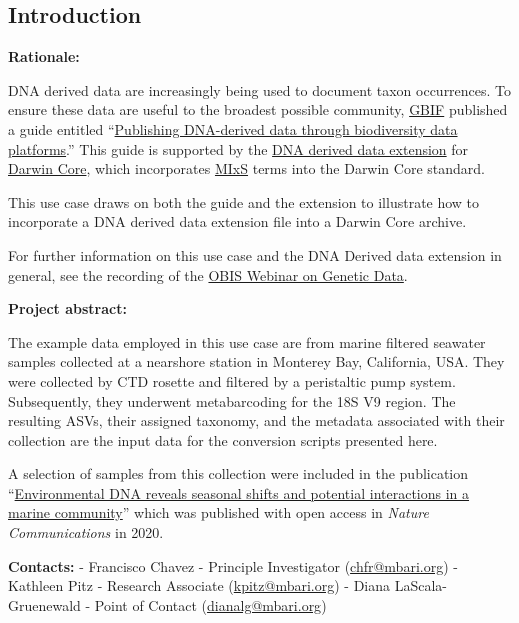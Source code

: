 \documentclass[
]{book}
\begin{document}
\hypertarget{introduction}{%
\subsection{Introduction}\label{introduction}}

\textbf{Rationale:}

DNA derived data are increasingly being used to document taxon
occurrences. To ensure these data are useful to the broadest possible
community, \href{https://www.gbif.org/}{GBIF} published a guide entitled ``\href{https://docs.gbif-uat.org/publishing-dna-derived-data/1.0/en/}{Publishing DNA-derived
data through biodiversity data platforms}.''
This guide is supported by the \href{https://tools.gbif.org/dwca-validator/extension.do?id=http://rs.gbif.org/terms/1.0/DNADerivedData}{DNA derived data extension}
for \href{https://dwc.tdwg.org/}{Darwin Core}, which incorporates \href{https://gensc.org/mixs/}{MIxS}
terms into the Darwin Core standard.

This use case draws on both the guide and the extension to illustrate
how to incorporate a DNA derived data extension file into a Darwin Core
archive.

For further information on this use case and the DNA Derived data extension
in general, see the recording of the \href{https://obis.org/2021/10/13/gendatawebinar/}{OBIS Webinar on Genetic Data}.

\textbf{Project abstract:}

The example data employed in this use case are from marine
filtered seawater samples collected at a nearshore station in
Monterey Bay, California, USA. They were collected by CTD
rosette and filtered by a peristaltic pump system. Subsequently,
they underwent metabarcoding for the 18S V9 region. The resulting
ASVs, their assigned taxonomy, and the metadata associated with their
collection are the input data for the conversion scripts
presented here.

A selection of samples from this collection were included in the
publication ``\href{https://www.nature.com/articles/s41467-019-14105-1}{Environmental DNA reveals seasonal shifts and potential
interactions in a marine community}''
which was published with open access in \emph{Nature Communications} in 2020.

\textbf{Contacts:}
- Francisco Chavez - Principle Investigator (\url{chfr@mbari.org})
- Kathleen Pitz - Research Associate (\url{kpitz@mbari.org})
- Diana LaScala-Gruenewald - Point of Contact (\url{dianalg@mbari.org})
\end{document}
